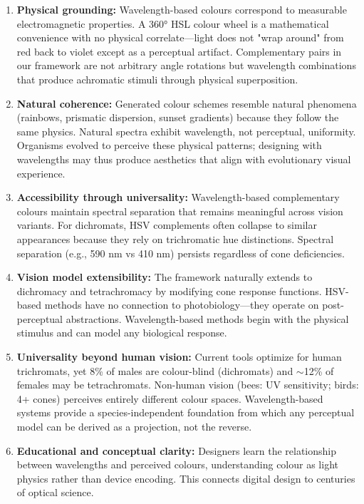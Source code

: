 \documentclass[12pt,a4paper]{article}
\begin{document}
\begin{enumerate}
\item \textbf{Physical grounding:} Wavelength-based colours correspond to measurable electromagnetic properties. A 360° HSL colour wheel is a mathematical convenience with no physical correlate—light does not "wrap around" from red back to violet except as a perceptual artifact. Complementary pairs in our framework are not arbitrary angle rotations but wavelength combinations that produce achromatic stimuli through physical superposition.

\item \textbf{Natural coherence:} Generated colour schemes resemble natural phenomena (rainbows, prismatic dispersion, sunset gradients) because they follow the same physics. Natural spectra exhibit wavelength, not perceptual, uniformity. Organisms evolved to perceive these physical patterns; designing with wavelengths may thus produce aesthetics that align with evolutionary visual experience.

\item \textbf{Accessibility through universality:} Wavelength-based complementary colours maintain spectral separation that remains meaningful across vision variants. For dichromats, HSV complements often collapse to similar appearances because they rely on trichromatic hue distinctions. Spectral separation (e.g., 590 nm vs 410 nm) persists regardless of cone deficiencies.

\item \textbf{Vision model extensibility:} The framework naturally extends to dichromacy and tetrachromacy by modifying cone response functions. HSV-based methods have no connection to photobiology—they operate on post-perceptual abstractions. Wavelength-based methods begin with the physical stimulus and can model any biological response.

\item \textbf{Universality beyond human vision:} Current tools optimize for human trichromats, yet 8\% of males are colour-blind (dichromats) and $\sim$12\% of females may be tetrachromats. Non-human vision (bees: UV sensitivity; birds: 4+ cones) perceives entirely different colour spaces. Wavelength-based systems provide a species-independent foundation from which any perceptual model can be derived as a projection, not the reverse.

\item \textbf{Educational and conceptual clarity:} Designers learn the relationship between wavelengths and perceived colours, understanding colour as light physics rather than device encoding. This connects digital design to centuries of optical science.
\end{enumerate}
\end{document}
